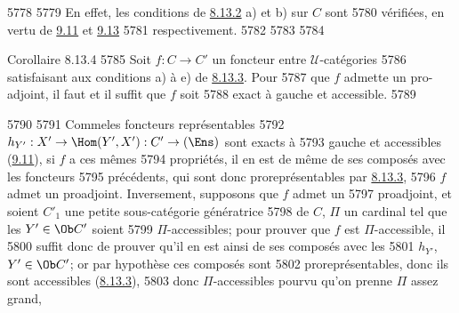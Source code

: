   5778	
  5779	En effet, les conditions de \hyperref[I.prop8.13.2]{8.13.2} a) et b) sur $C$ sont
  5780	vérifiées, en vertu de \hyperref[I.prop9.11]{9.11} et \hyperref[I.prop9.13]{9.13}
  5781	respectivement.
  5782	
  5783	
  5784	\begin{enonce*}{Corollaire 8.13.4}
  5785	Soit $f:C\rightarrow C'$ un foncteur entre $𝒰$-catégories
  5786	satisfaisant aux conditions {\rm a)} à {\rm e)} de \hyperref[I.cor8.13.3]{8.13.3}. Pour
  5787	que $f$ admette un pro-adjoint, il faut et il suffit que $f$ soit
  5788	exact à gauche et accessible.
  5789	\end{enonce*}
  5790	
  5791	Comme\pageoriginale les foncteurs représentables
  5792	$h_{Y'}:X'\rightarrow \Hom(Y',X'):C'\rightarrow(\Ens)$ sont exacts à
  5793	gauche et accessibles (\hyperref[I.prop9.11]{9.11}), si $f$ a ces mêmes
  5794	propriétés, il en est de même de ses composés avec les foncteurs
  5795	précédents, qui sont donc proreprésentables par \hyperref[I.cor8.13.3]{8.13.3},
  5796	\ie $f$ admet un proadjoint. Inversement, supposons que $f$ admet un
  5797	proadjoint, et soient $C'_1$ une petite sous-catégorie génératrice
  5798	de $C$, $\Pi$ un cardinal tel que les $Y'\in \Ob C'$ soient
  5799	$\Pi$-accessibles; pour prouver que $f$ est $\Pi$-accessible, il
  5800	suffit donc de prouver qu'il en est ainsi de ses composés avec les
  5801	$h_{Y'}$, $Y'\in \Ob C'$; or par hypothèse ces composés sont
  5802	proreprésentables, donc ils sont accessibles (\hyperref[I.cor8.13.3]{8.13.3}),
  5803	donc $\Pi$-accessibles pourvu qu'on prenne $\Pi$ assez grand, 	

